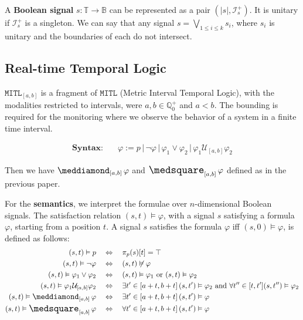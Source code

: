 \documentclass{suftesi}
\renewcommand{\b}{\textbf}
\newcommand{\MITL}{$\mathtt{MITL}$ }
\newcommand{\abs}[1]{\lvert #1 \rvert}
\begin{document}
A \b{Boolean signal} $s:\mathbb{T}\to\mathbb{B}$ can be represented as a pair $(\abs{s}, \mathcal{I}^+_s)$. It is unitary if $\mathcal{I}^+_s$ is a singleton. We can say that any signal $s=\bigvee_{1\leq i\leq k}s_i$, where $s_i$ is unitary and the boundaries of each do not intersect. 

\subsection{Real-time Temporal Logic}

$\mathtt{MITL}_{[a,b]}$ is a fragment of \MITL (Metric Interval Temporal Logic), with the modalities restricted to intervals, were $a,b\in \mathbb{Q}^+_0$ and $a<b$. The bounding is required for the monitoring where we observe the behavior of a system in a finite time interval.

\begin{align*}
    \textbf{Syntax:}    &\quad\varphi:=p\,|\,\lnot\varphi\,|\,\varphi_1\lor\varphi_2\,|\,\varphi_1\mathcal{U}_{[a,b]}\varphi_2
\end{align*}

Then we have $\pos_{[a,b]}\varphi$ and $\nec_{[a,b]}\varphi$ defined as in the previous paper.

For the \b{semantics}, we interpret the formulae over $n$-dimensional Boolean signals. The satisfaction relation $(s,t)\vDash\varphi$, with a signal $s$ satisfying a formula $\varphi$, starting from a position $t$. A signal $s$ satisfies the formula $\varphi$ iff $(s,0)\vDash\varphi$, is defined as follows:
\begin{align*}
    (s,t)\vDash p                                       &\quad\Leftrightarrow\quad  \pi_p(s)[t]=\top\\
    (s,t)\vDash\lnot\varphi                             &\quad\Leftrightarrow\quad  (s,t)\not\vDash\varphi\\
    (s,t)\vDash\varphi_1\lor\varphi_2                   &\quad\Leftrightarrow\quad  (s,t)\vDash\varphi_1 \text{ or }(s,t)\vDash\varphi_2\\
    (s,t)\vDash\varphi_1\mathcal{U}_{[a,b]}\varphi_2    &\quad\Leftrightarrow\quad  \exists t'\in[a+t,b+t]\,(s,t')\vDash\varphi_2 \text{ and }\forall t''\in[t,t'](s,t'')\vDash\varphi_2\\
    (s,t)\vDash \pos_{[a,b]}\varphi                     &\quad\Leftrightarrow\quad  \exists t'\in[a+t,b+t]\,(s,t')\vDash\varphi\\
    (s,t)\vDash \nec_{[a,b]}\varphi                     &\quad\Leftrightarrow\quad  \forall t'\in[a+t,b+t]\,(s,t')\vDash\varphi\\
\end{align*}
\end{document}
